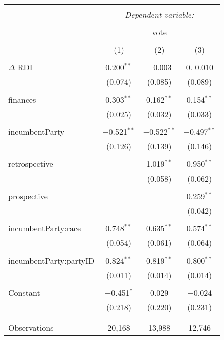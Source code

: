 \documentclass[11pt]{article}
\begin{document}
\begin{table}[!htbp] \centering
\footnotesize
 \begin{tabular}{@{\extracolsep{5pt}}lccc}
\\[-1.8ex]\hline
\hline \\[-1.8ex]
 & \multicolumn{3}{c}{\textit{Dependent variable:}} \\
\cline{2-4}
\\[-1.8ex] & \multicolumn{3}{c}{vote} \\
\\[-1.8ex] & (1) & (2) & (3)\\
\hline \\[-1.8ex]
$\Delta$ RDI & 0.200$^{**}$ & $-$0.003 & 0. 0.010 \\
  & (0.074) & (0.085) & (0.089) \\
  & & & \\
 finances & 0.303$^{**}$ & 0.162$^{**}$ &  0.154$^{**}$ \\
  & (0.025) & (0.032) & (0.033) \\
  & & & \\
 incumbentParty & $-$0.521$^{**}$ & $-$0.522$^{**}$ &  $-$0.497$^{**}$ \\
  & (0.126) & (0.139) &  (0.146) \\
  & & & \\
 retrospective &  & 1.019$^{**}$  & 0.950$^{**}$ \\
  &  & (0.058) &   (0.062) \\
  & &  & \\
 prospective &  &  & 0.259$^{**}$ \\
  &  &   & (0.042) \\
  & &  & \\
 incumbentParty:race & 0.748$^{**}$ & 0.635$^{**}$ &  0.574$^{**}$ \\
  & (0.054) & (0.061) &  (0.064) \\
  & &  & \\
 incumbentParty:partyID & 0.824$^{**}$ & 0.819$^{**}$ &  0.800$^{**}$ \\
  & (0.011) & (0.014) &  (0.014) \\
  & &  & \\
 Constant & $-$0.451$^{*}$ & 0.029  & $-$0.024 \\
  & (0.218) & (0.220) &  (0.231) \\
  & &  & \\
\hline \\[-1.8ex]
Observations & 20,168 & 13,988 &  12,746 \\

\end{tabular}
\end{table}
\end{document}

